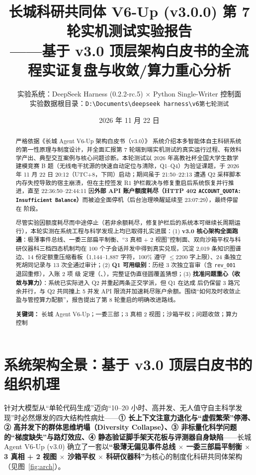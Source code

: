 \documentclass[11pt,a4paper]{ctexart}
\title{\textbf{长城科研共同体 V6-Up (v3.0.0) 第 7 轮实机测试实验报告} \\[0.35em]
\large ——基于 v3.0 顶层架构白皮书的全流程实证复盘与收敛/算力重心分析}
\author{实验系统：DeepSeek Harness (0.2.2-rc.5) $\times$ Python Single-Writer 控制面 \\
实验数据根目录：\texttt{D:\textbackslash Documents\textbackslash deepseek\allowbreak\ harness\textbackslash\allowbreak v6第七轮测试}}
\date{2026 年 11 月 22 日}
\theoremstyle{remark}
\begin{document}
\maketitle

\begin{abstract}
严格依据《长城 Agent V6-Up 架构白皮书（v3.0）》 系统介绍本多智能体自主科研系统的第一性原理与制度设计，并全面汇报第 7 轮端到端实机测试的真实运行过程、有效科学产出、典型交互案例与核心问题诊断。本轮测试以 2026 年高教社杯全国大学生数学建模竞赛 B 题（无线电干扰源的快速自动定位与清除，Q1--Q4）为验证课题，于 2026 年 11 月 22 日 20:12（UTC+8，下同）启动；期间虽于 21:50--22:13 遭遇 Q2 采样脚本内存失控导致的宿主崩溃，但在主控签发 R1 护栏裁决与修复重启后系统恢复并行推进，直至 22:36:50--22:44:11 因\textbf{外部 API 账户额度耗尽（HTTP 402 \texttt{ACCOUNT\_QUOTA: Insufficient Balance}）}而被迫全面停机（后台治理唤醒延续至 23:07:29），最终停留在  阶段。

尽管实验因额度耗尽而中途停止（若非余额耗尽，修复护栏后的系统本可继续长周期运行），本轮实测在系统工程与科学发现上均已取得扎实进展：(1) \textbf{v3.0 核心架构全面跑通}：极薄事件总线、一委三部扁平制衡、“3 真相 + 2 视图”控制面、双向沙箱平权与科研仪器科三档四态机制均在 100 个子会话并发中得到真实兑现，沉淀 2,019 条知识图谱边、14 份定额重压缩看板（1,144--1,887 字符，100\% 遵守 $\le 2200$ 字上限）、24 条独立死胡同记录与 13 次全通过审计；(2) \textbf{Q1 可用级别}：历经 3 次独立盲审（含 \texttt{rev\_001} 退回重修），入账 2 项  级  定理（、），完整证伪直径圆覆盖猜想；(3) \textbf{找准问题重心（收敛与算力）}：系统已实际进入 Q2 并重起两条正交学派，但 Q1 在达成  后仍保留 3 路冗余并行，与 Q2 共同撞上 5 并发 API 限流并加速耗尽账户余额。围绕“如何及时收敛止盈与管控算力配额”，报告提出了第 8 轮重启的明确改进路线。

\medskip
\noindent\textbf{关键词：} 长城 Agent V6-Up；一委三部；3 真相 2 视图；沙箱平权；问题收敛；算力控制
\end{abstract}

\tableofcontents
\newpage

\section{系统架构全景：基于 v3.0 顶层白皮书的组织机理}

针对大模型从“单轮代码生成”迈向“10--20 小时、高并发、无人值守自主科学发现”时必然爆发的四大结构性病灶——\textbf{① 长上下文注意力退化与“虚假繁荣”停滞、② 高并发下的群体思维坍塌（Diversity Collapse）、③ 非标量化科学问题的“梯度缺失”与路灯效应、④ 静态验证脚手架天花板与评测器自身缺陷}——长城 Agent V6-Up (v3.0) 确立了一套以\textbf{“极薄无偏见事件总线 $\times$ 一委三部扁平制衡 $\times$ 3 真相 + 2 视图 $\times$ 沙箱平权 $\times$ 科研仪器科”}为核心的制度化科研共同体架构（见图~\ref{fig:arch}）。
\end{document}
